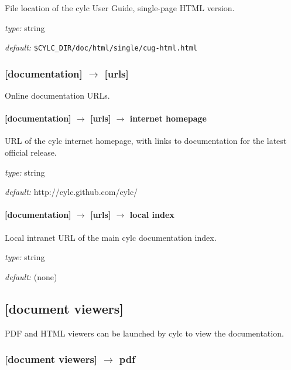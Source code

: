 File location of the cylc User Guide, single-page HTML version.
\begin{myitemize}
\item {\em type:} string
\item {\em default:} \lstinline=$CYLC_DIR/doc/html/single/cug-html.html=
\end{myitemize}

\subsubsection[{[[}urls{]]}]{[documentation] $\rightarrow$ [urls]}

Online documentation URLs.

\paragraph[internet homepage]{[documentation] $\rightarrow$ [urls] $\rightarrow$ internet homepage }

URL of the cylc internet homepage, with links to documentation for the
latest official release.

\begin{myitemize}
\item {\em type:} string
\item {\em default:} http://cylc.github.com/cylc/
\end{myitemize}

\paragraph[local index]{[documentation] $\rightarrow$ [urls] $\rightarrow$ local index}

Local intranet URL of the main cylc documentation index.

\begin{myitemize}
\item {\em type:} string
\item {\em default:} (none)
\end{myitemize}

\subsection{[document viewers]}

PDF and HTML viewers can be launched by cylc to view the documentation.

\subsubsection[pdf]{[document viewers] $\rightarrow$ pdf}

